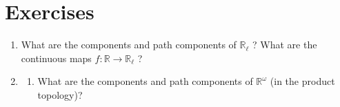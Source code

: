 \section*{Exercises}
\begin{enumerate}[itemsep=0.4em, parsep=0pt, topsep=0pt, partopsep=0pt, leftmargin=*, label=\arabic*., ref=\arabic*]
\item What are the components and path components of \(\mathbb{R}_{\ell }\) ? What are the continuous maps \(f : \mathbb{R} \rightarrow {\mathbb{R}}_{\ell }\) ?
\item
 \begin{enumerate}[itemsep=0.2em, parsep=0pt, topsep=0pt, partopsep=0pt, leftmargin=*, label=(\alph*), align=left]
 \item What are the components and path components of \(\mathbb{R}^{\omega }\) (in the product topology)?


\end{enumerate}
\end{enumerate}
